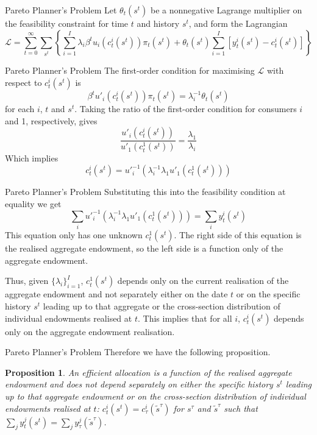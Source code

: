 \documentclass[aspectratio=169,xcolor=dvipsnames]{beamer}
\newtheorem{proposition}{Proposition}
\begin{document}
\begin{frame}{Pareto Planner's Problem}
    Let $\theta_t(s^t)$ be a nonnegative Lagrange multiplier on the feasibility constraint for time $t$ and history $s^t$, and form the Lagrangian
    \[
        \mathcal{L} = \sum_{t=0}^\infty \sum_{s^t} \left\{ \sum_{i=1}^I \lambda_i \beta^t u_i(c^i_t(s^t)) \pi_t(s^t) + \theta_t(s^t) \sum_{i=1}^I [y^i_t(s^t) - c^i_t(s^t)]\right\}
    \]
\end{frame}

\begin{frame}{Pareto Planner's Problem}
    The first-order condition for maximising $\mathcal{L}$ with respect to $c^i_t(s^t)$ is
    \[
        \beta^t u'_i(c^i_t(s^t)) \pi_t(s^t) = \lambda_i^{-1} \theta_t(s^t)
    \]
    for each $i$, $t$ and $s^t$. Taking the ratio of the first-order condition for consumers $i$ and 1, respectively, gives
    \[
        \frac{u'_i(c^i_t(s^t))}{u'_1(c^1_t(s^t))} = \frac{\lambda_1}{\lambda_i}
    \]
    Which implies
    \[
        c^i_t(s^t) = u'^{-1}_i(\lambda_i^{-1} \lambda_1 u'_1(c^1_t(s^t)))
    \]
\end{frame}

\begin{frame}{Pareto Planner's Problem}
    Substituting this into the feasibility condition at equality we get
    \[
        \sum_i u'^{-1}_i (\lambda_i^{-1} \lambda_1 u'_1(c^1_t(s^t))) = \sum_i y^i_t(s^t)
    \]
    This equation only has one unknown $c^1_t(s^t)$. The right side of this equation is the realised aggregate endowment, so the left side is a function only of the aggregate endowment.

    Thus, given $\{\lambda_i\}_{i=1}^I$, $c^1_t(s^t)$ depends only on the current realisation of the aggregate endowment and not separately either on the date $t$ or on the specific history $s^t$ leading up to that aggregate or the cross-section distribution of individual endowments realised at $t$. This implies that for all $i$, $c^i_t(s^t)$ depends only on the aggregate endowment realisation.
\end{frame}

\begin{frame}{Pareto Planner's Problem}
    Therefore we have the following proposition.

    \begin{proposition}
        An efficient allocation is a function of the realised aggregate endowment and does not depend separately on either the specific history $s^t$ leading up to that aggregate endowment or on the cross-section distribution of individual endowments realised at $t$: $c^i_t(s^t) = c^i_\tau(\tilde s^\tau)$ for $s^\tau$ and $\tilde s^\tau$ such that $\sum_j y^j_t(s^t) = \sum_j y^j_\tau(\tilde s^\tau)$.
    \end{proposition}
\end{frame}
\end{document}
